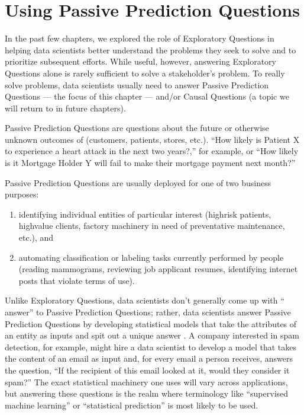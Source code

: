 \documentclass[letterpaper,10pt,english]{jupyterBook}
\begin{document}
\sphinxstepscope


\chapter{Using Passive Prediction Questions}
\label{\detokenize{30_questions/20_using_passive_prediction_questions:using-passive-prediction-questions}}\label{\detokenize{30_questions/20_using_passive_prediction_questions::doc}}
\sphinxAtStartPar
In the past few chapters, we explored the role of Exploratory Questions in helping data scientists better understand the problems they seek to solve and to prioritize subsequent efforts. While useful, however, answering Exploratory Questions alone is rarely sufficient to solve a stakeholder’s problem. To really solve problems, data scientists usually need to answer Passive Prediction Questions — the focus of this chapter — and/or Causal Questions (a topic we will return to in future chapters).

\sphinxAtStartPar
Passive Prediction Questions are questions about the future or otherwise unknown outcomes of  (customers, patients, stores, etc.). “How likely is Patient X to experience a heart attack in the next two years?,” for example, or “How likely is it Mortgage Holder Y will fail to make their mortgage payment next month?”

\sphinxAtStartPar
Passive Prediction Questions are usually deployed for one of two business purposes:
\begin{enumerate}
%
\item {} 
\sphinxAtStartPar
identifying individual entities of particular interest (high\sphinxhyphen{}risk patients, high\sphinxhyphen{}value clients, factory machinery in need of preventative maintenance, etc.), and

\item {} 
\sphinxAtStartPar
automating classification or labeling tasks currently performed by people (reading mammograms, reviewing job applicant resumes, identifying internet posts that violate terms of use).

\end{enumerate}

\sphinxAtStartPar
Unlike Exploratory Questions, data scientists don’t generally come up with “ answer” to Passive Prediction Questions; rather, data scientists answer Passive Prediction Questions by developing statistical models that take the attributes of an entity as inputs and spit out a unique answer . A company interested in spam detection, for example, might hire a data scientist to develop a model that takes the content of an email as input and, for every email a person receives, answers the question, “If the recipient of this email looked at it, would they consider it spam?” The exact statistical machinery one uses will vary across applications, but answering these questions is the realm where terminology like “supervised machine learning” or “statistical prediction” is most likely to be used.
\end{document}
